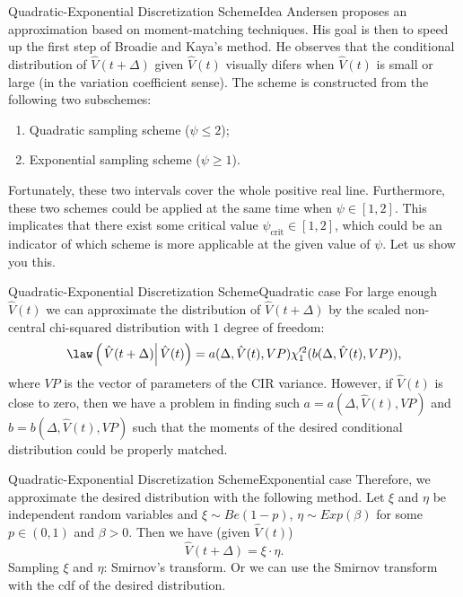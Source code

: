     \begin{frame}{Quadratic-Exponential Discretization Scheme}{Idea}
        Andersen proposes an approximation based on moment-matching techniques. His goal is then to speed up the first step of Broadie and Kaya's method.
        He observes that the conditional distribution of $\hat{V}(t+\Delta)$ given $\hat{V}(t)$ visually difers when $\hat{V}(t)$ is small or large (in the variation coefficient sense).
        The scheme is constructed from the following two subschemes:
        \begin{enumerate}
            \item Quadratic sampling scheme ($\psi \leq 2$);
            \item Exponential sampling scheme ($\psi \geq 1$).
        \end{enumerate}
        Fortunately, these two intervals cover the whole positive real line. Furthermore, these two schemes could be applied at the same time when $\psi\in[1, 2]$. This implicates that there exist some critical value $\psi_{\text{crit}}\in[1, 2]$, which could be an indicator of which scheme is more applicable at the given value of $\psi$. Let us show you this.
    \end{frame}

    \begin{frame}{Quadratic-Exponential Discretization Scheme}{Quadratic case}
        For large enough $\hat{V}(t)$ we can approximate the distribution of $\hat{V}(t+\Delta)$ by the scaled non-central chi-squared distribution with $1$ degree of freedom:
        \begin{align}
            \law\left(\left.\hat{V}(t+\Delta) \right| \hat V(t)\right) =  a(\Delta, \hat{V}(t), VP) \chi'^2_1(b(\Delta, \hat{V}(t), VP)),
        \end{align}
        where $VP$ is the vector of parameters of the CIR variance.
        However, if $\hat{V}(t)$ is close to zero, then we have a problem in finding such $a = a(\Delta, \hat{V}(t), VP)$ and $b = b(\Delta, \hat{V}(t), VP)$ such that the moments of the desired conditional distribution could be properly matched.
    \end{frame}

    \begin{frame}{Quadratic-Exponential Discretization Scheme}{Exponential case}
        Therefore, we approximate the desired distribution with the following method. Let $\xi$ and $\eta$ be independent random variables and  $\xi \sim Be(1-p)$, $\eta \sim Exp(\beta)$ for some $p \in (0, 1)$ and $\beta > 0$. Then we have (given $\hat{V}(t)$)
        \begin{equation}
            \hat{V}(t+\Delta) = \xi\cdot\eta.
        \end{equation}
        Sampling $\xi$ and $\eta$: Smirnov's transform. Or we can use the Smirnov transform with the cdf of the desired distribution.
    \end{frame}

